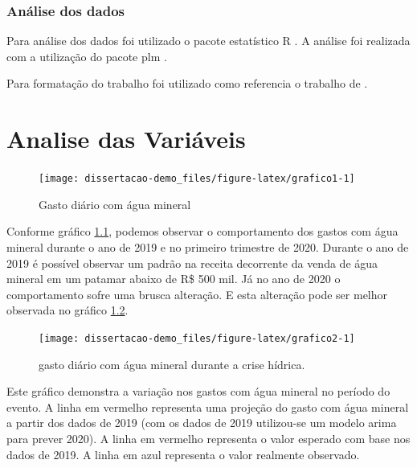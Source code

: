 \documentclass[
  12pt,
]{book}
\begin{document}
\hypertarget{anuxe1lise-dos-dados}{%
\subsection{Análise dos dados}\label{anuxe1lise-dos-dados}}

Para análise dos dados foi utilizado o pacote estatístico R \citep{R-base}. A análise foi realizada com a utilização do pacote plm \citep{plm}.

Para formatação do trabalho foi utilizado como referencia o trabalho de \citet{xie2015}.

\hypertarget{analise-das-variuxe1veis}{%
\chapter{Analise das Variáveis}\label{analise-das-variuxe1veis}}

\begin{figure}

{\centering \texttt{[image: dissertacao-demo\_files/figure-latex/grafico1-1]} 

}

\caption{Gasto diário com água mineral}\label{fig:grafico1}
\end{figure}

Conforme gráfico \ref{fig:grafico1}, podemos observar o comportamento dos gastos com água mineral durante o ano de 2019 e no primeiro trimestre de 2020. Durante o ano de 2019 é possível observar um padrão na receita decorrente da venda de água mineral em um patamar abaixo de R\$ 500 mil. Já no ano de 2020 o comportamento sofre uma brusca alteração. E esta alteração pode ser melhor observada no gráfico \ref{fig:grafico2}.

\begin{figure}

{\centering \texttt{[image: dissertacao-demo\_files/figure-latex/grafico2-1]} 

}

\caption{gasto diário com água mineral durante a crise hídrica.}\label{fig:grafico2}
\end{figure}

Este gráfico demonstra a variação nos gastos com água mineral no período do evento. A linha em vermelho representa uma projeção do gasto com água mineral a partir dos dados de 2019 (com os dados de 2019 utilizou-se um modelo arima para prever 2020). A linha em vermelho representa o valor esperado com base nos dados de 2019. A linha em azul representa o valor realmente observado.
\end{document}
